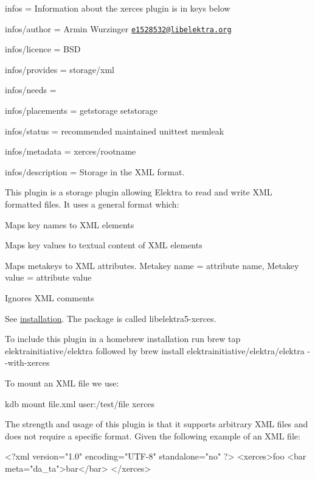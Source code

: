 
\begin{DoxyItemize}
\item infos = Information about the xerces plugin is in keys below
\item infos/author = Armin Wurzinger \href{mailto:e1528532@libelektra.org}{\tt e1528532@libelektra.\+org}
\item infos/licence = B\+SD
\item infos/provides = storage/xml
\item infos/needs =
\item infos/placements = getstorage setstorage
\item infos/status = recommended maintained unittest memleak
\item infos/metadata = xerces/rootname
\item infos/description = Storage in the X\+ML format.
\end{DoxyItemize}

This plugin is a storage plugin allowing Elektra to read and write X\+ML formatted files. It uses a general format which\+:


\begin{DoxyItemize}
\item Maps key names to X\+ML elements
\item Maps key values to textual content of X\+ML elements
\item Maps metakeys to X\+ML attributes. Metakey name = attribute name, Metakey value = attribute value
\item Ignores X\+ML comments
\end{DoxyItemize}

See \hyperlink{doc_INSTALL_md}{installation}. The package is called {\ttfamily libelektra5-\/xerces}.

To include this plugin in a homebrew installation run {\ttfamily brew tap elektrainitiative/elektra} followed by {\ttfamily brew install elektrainitiative/elektra/elektra -\/-\/with-\/xerces}

To mount an X\+ML file we use\+:


\begin{DoxyCode}
kdb mount file.xml user:/test/file xerces
\end{DoxyCode}


The strength and usage of this plugin is that it supports arbitrary X\+ML files and does not require a specific format. Given the following example of an X\+ML file\+:


\begin{DoxyCode}
<?\textcolor{keyword}{xml} \textcolor{keyword}{version}=\textcolor{stringliteral}{"1.0"} \textcolor{keyword}{encoding}=\textcolor{stringliteral}{"UTF-8"} \textcolor{keyword}{standalone}=\textcolor{stringliteral}{"no"} ?>
<\textcolor{keywordtype}{xerces}>\textcolor{keyword}{foo}
  <\textcolor{keywordtype}{bar} \textcolor{keyword}{meta}=\textcolor{stringliteral}{"da\_ta"}>\textcolor{keyword}{bar}</\textcolor{keywordtype}{bar}>
</\textcolor{keywordtype}{xerces}>
\end{DoxyCode}


